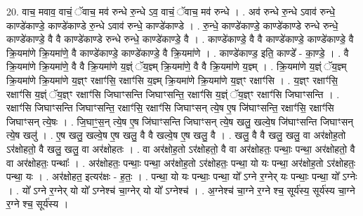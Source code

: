 \documentclass[17pt]{extarticle}
\begin{document}
20. वाच॒ मवाव॒ वाचं॒ ॅवाच॒ मव॑ रुन्धे रु॒न्धे ऽव॒ वाचं॒ ॅवाच॒ मव॑ रुन्धे । . अव॑ रुन्धे रु॒न्धे ऽवाव॑ रुन्धे॒ काण्डे॑काण्डे॒ काण्डे॑काण्डे रु॒न्धे ऽवाव॑ रुन्धे॒ काण्डे॑काण्डे । . रु॒न्धे॒ काण्डे॑काण्डे॒ काण्डे॑काण्डे रुन्धे रुन्धे॒ काण्डे॑काण्डे॒ वै वै काण्डे॑काण्डे रुन्धे रुन्धे॒ काण्डे॑काण्डे॒ वै । . काण्डे॑काण्डे॒ वै वै काण्डे॑काण्डे॒ काण्डे॑काण्डे॒ वै क्रि॒यमा॑णे क्रि॒यमा॑णे॒ वै काण्डे॑काण्डे॒ काण्डे॑काण्डे॒ वै क्रि॒यमा॑णे । . काण्डे॑काण्ड॒ इति॒ काण्डे᳚ - का॒ण्डे॒ । . वै क्रि॒यमा॑णे क्रि॒यमा॑णे॒ वै वै क्रि॒यमा॑णे य॒ज्ञ्ं ॅय॒ज्ञ्म् क्रि॒यमा॑णे॒ वै वै क्रि॒यमा॑णे य॒ज्ञ्म् । . क्रि॒यमा॑णे य॒ज्ञ्ं ॅय॒ज्ञ्म् क्रि॒यमा॑णे क्रि॒यमा॑णे य॒ज्ञ्ꣳ रक्षाꣳ॑सि॒ रक्षाꣳ॑सि य॒ज्ञ्म् क्रि॒यमा॑णे क्रि॒यमा॑णे य॒ज्ञ्ꣳ रक्षाꣳ॑सि । . य॒ज्ञ्ꣳ रक्षाꣳ॑सि॒ रक्षाꣳ॑सि य॒ज्ञ्ं ॅय॒ज्ञ्ꣳ रक्षाꣳ॑सि जिघाꣳसन्ति जिघाꣳसन्ति॒ रक्षाꣳ॑सि य॒ज्ञ्ं ॅय॒ज्ञ्ꣳ रक्षाꣳ॑सि जिघाꣳसन्ति । . रक्षाꣳ॑सि जिघाꣳसन्ति जिघाꣳसन्ति॒ रक्षाꣳ॑सि॒ रक्षाꣳ॑सि जिघाꣳसन् त्ये॒ष ए॒ष जि॑घाꣳसन्ति॒ रक्षाꣳ॑सि॒ रक्षाꣳ॑सि जिघाꣳसन् त्ये॒षः । . जि॒घाꣳ॒॒स॒न् त्ये॒ष ए॒ष जि॑घाꣳसन्ति जिघाꣳसन् त्ये॒ष खलु॒ खल्वे॒ष जि॑घाꣳसन्ति जिघाꣳसन् त्ये॒ष खलु॑ । . ए॒ष खलु॒ खल्वे॒ष ए॒ष खलु॒ वै वै खल्वे॒ष ए॒ष खलु॒ वै । . खलु॒ वै वै खलु॒ खलु॒ वा अर॑क्षोह॒तो ऽर॑क्षोहतो॒ वै खलु॒ खलु॒ वा अर॑क्षोहतः । . वा अर॑क्षोह॒तो ऽर॑क्षोहतो॒ वै वा अर॑क्षोहतः॒ पन्थाः॒ पन्था॒ अर॑क्षोहतो॒ वै वा अर॑क्षोहतः॒ पन्थाः᳚ । . अर॑क्षोहतः॒ पन्थाः॒ पन्था॒ अर॑क्षोह॒तो ऽर॑क्षोहतः॒ पन्था॒ यो यः पन्था॒ अर॑क्षोह॒तो ऽर॑क्षोहतः॒ पन्था॒ यः । . अर॑क्षोहत॒ इत्यर॑क्षः - ह॒तः॒ । . पन्था॒ यो यः पन्थाः॒ पन्था॒ यो᳚ ऽग्ने र॒ग्नेर् यः पन्थाः॒ पन्था॒ यो᳚ ऽग्नेः । . यो᳚ ऽग्ने र॒ग्नेर् यो यो᳚ ऽग्नेश्च॑ चा॒ग्नेर् यो यो᳚ ऽग्नेश्च॑ । . अ॒ग्नेश्च॑ चा॒ग्ने र॒ग्ने श्च॒ सूर्य॑स्य॒ सूर्य॑स्य चा॒ग्ने र॒ग्ने श्च॒ सूर्य॑स्य । \newline
\end{document}
